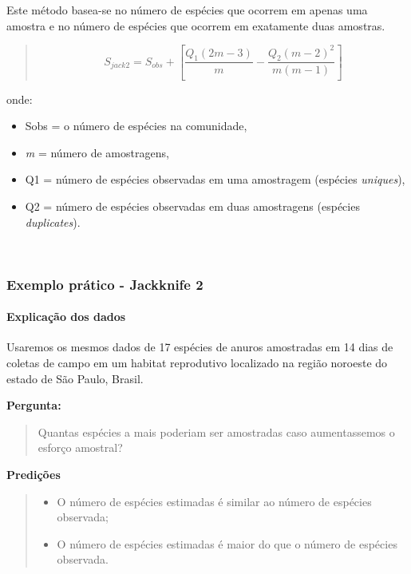 \documentclass[
]{book}
\providecommand{\tightlist}{%
  \setlength{\itemsep}{0pt}\setlength{\parskip}{0pt}}
\begin{document}
Este método basea-se no número de espécies que ocorrem em apenas uma amostra e no número de espécies que ocorrem em exatamente duas amostras.

\begin{quote}
\[S_{jack2} = S_{obs} + \left[\frac{Q_1(2m - 3)}{m}-\frac{Q_2(m - 2)^2}{m(m-1)}\right]\]
\end{quote}

onde:

\begin{itemize}
\item
  Sobs = o número de espécies na comunidade,
\item
  \emph{m} = número de amostragens,
\item
  Q1 = número de espécies observadas em uma amostragem (espécies \emph{uniques}),
\item
  Q2 = número de espécies observadas em duas amostragens (espécies \emph{duplicates}).
\end{itemize}

~

\hypertarget{exemplo-pruxe1tico---jackknife-2}{%
\subsubsection{Exemplo prático - Jackknife 2}\label{exemplo-pruxe1tico---jackknife-2}}

\hypertarget{explicauxe7uxe3o-dos-dados-4}{%
\paragraph{Explicação dos dados}\label{explicauxe7uxe3o-dos-dados-4}}

Usaremos os mesmos dados de 17 espécies de anuros amostradas em 14 dias de coletas de campo em um habitat reprodutivo localizado na região noroeste do estado de São Paulo, Brasil.

\textbf{Pergunta:}

\begin{quote}
Quantas espécies a mais poderiam ser amostradas caso aumentassemos o esforço amostral?
\end{quote}

\textbf{Predições}

\begin{quote}
\begin{itemize}
\tightlist
\item
  O número de espécies estimadas é similar ao número de espécies observada;
\item
  O número de espécies estimadas é maior do que o número de espécies observada.
\end{itemize}
\end{quote}
\end{document}
